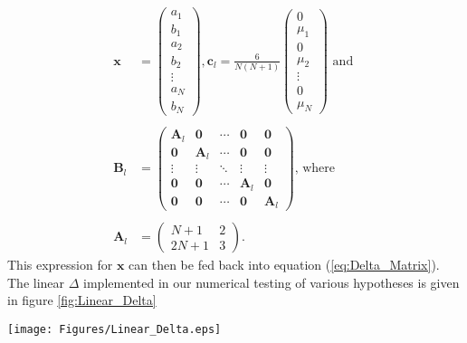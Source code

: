 \documentclass[10pt,journal,compsoc]{IEEEtran}
\begin{document}
\begin{align*}
      \boldsymbol{x} &= \begin{pmatrix}
           a_1 \\
           b_1 \\
           a_2 \\
           b_2 \\
           \vdots \\
           a_N \\
           b_N
         \end{pmatrix},
         \boldsymbol{c}_l = \frac{6}{N(N+1)}\begin{pmatrix}
           0 \\
           \mu_1 \\
           0 \\
           \mu_2 \\
           \vdots \\
           0 \\
           \mu_N
         \end{pmatrix} \text{ and }\\
         \\
         \boldsymbol{B}_l &=
         \begin{pmatrix}
\boldsymbol{A}_l & \boldsymbol{0} & \cdots &\boldsymbol{0} & \boldsymbol{0} \\
\boldsymbol{0} & \boldsymbol{A}_l & \cdots & \boldsymbol{0} & \boldsymbol{0} \\
\vdots & \vdots & \ddots & \vdots & \vdots \\
\boldsymbol{0} & \boldsymbol{0} & \cdots & \boldsymbol{A}_l & \boldsymbol{0} \\
\boldsymbol{0} & \boldsymbol{0} & \cdots & \boldsymbol{0} & \boldsymbol{A}_l
\end{pmatrix} \text{, where}\\
\\
\boldsymbol{A}_l &=
\begin{pmatrix}
N+1 & 2 \\
2N+1 & 3
\end{pmatrix}.
\end{align*}
This expression for $\boldsymbol{x}$ can then be fed back into equation (\ref{eq:Delta_Matrix}).
The linear $\Delta$ implemented in our numerical testing of various hypotheses is given in figure \ref{fig:Linear_Delta}

\begin{minipage}{0.95\linewidth}
\centering
\texttt{[image: Figures/Linear\_Delta.eps]}
\label{fig:Linear_Delta}
\end{minipage}
\end{document}
